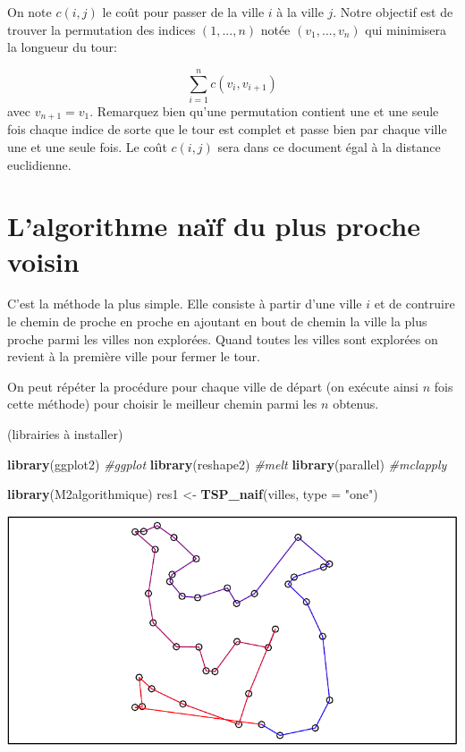 \documentclass[
]{article}
\newenvironment{Shaded}{\begin{snugshade}}{\end{snugshade}}
\newcommand{\AttributeTok}[1]{\textcolor[rgb]{0.13,0.29,0.53}{#1}}
\newcommand{\CommentTok}[1]{\textcolor[rgb]{0.56,0.35,0.01}{\textit{#1}}}
\newcommand{\FunctionTok}[1]{\textcolor[rgb]{0.13,0.29,0.53}{\textbf{#1}}}
\newcommand{\NormalTok}[1]{#1}
\newcommand{\OtherTok}[1]{\textcolor[rgb]{0.56,0.35,0.01}{#1}}
\newcommand{\StringTok}[1]{\textcolor[rgb]{0.31,0.60,0.02}{#1}}
\begin{document}
On note \(c(i,j)\) le coût pour passer de la ville \(i\) à la ville
\(j\). Notre objectif est de trouver la permutation des indices
\((1,...,n)\) notée \((v_1,...,v_n)\) qui minimisera la longueur du
tour:

\[\sum_{i=1}^{n}c(v_i,v_{i+1})\] avec \(v_{n+1} = v_1\). Remarquez bien
qu'une permutation contient une et une seule fois chaque indice de sorte
que le tour est complet et passe bien par chaque ville une et une seule
fois. Le coût \(c(i,j)\) sera dans ce document égal à la distance
euclidienne.

\section{L'algorithme naïf du plus proche
voisin}\label{lalgorithme-nauxeff-du-plus-proche-voisin}

C'est la méthode la plus simple. Elle consiste à partir d'une ville
\(i\) et de contruire le chemin de proche en proche en ajoutant en bout
de chemin la ville la plus proche parmi les villes non explorées. Quand
toutes les villes sont explorées on revient à la première ville pour
fermer le tour.

On peut répéter la procédure pour chaque ville de départ (on exécute
ainsi \(n\) fois cette méthode) pour choisir le meilleur chemin parmi
les \(n\) obtenus.

(librairies à installer)

\begin{Shaded}
\begin{Highlighting}[]
\FunctionTok{library}\NormalTok{(ggplot2) }\CommentTok{\#ggplot}
\FunctionTok{library}\NormalTok{(reshape2) }\CommentTok{\#melt}
\FunctionTok{library}\NormalTok{(parallel) }\CommentTok{\#mclapply}
\end{Highlighting}
\end{Shaded}

\begin{Shaded}
\begin{Highlighting}[]
\FunctionTok{library}\NormalTok{(M2algorithmique)}
\NormalTok{res1 }\OtherTok{\textless{}{-}} \FunctionTok{TSP\_naif}\NormalTok{(villes, }\AttributeTok{type =} \StringTok{"one"}\NormalTok{)}
\end{Highlighting}
\end{Shaded}

\includegraphics{TSP_analyse_files/figure-latex/unnamed-chunk-5-1.pdf}
\end{document}
